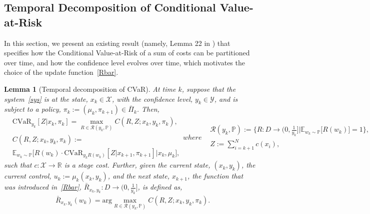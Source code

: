 \documentclass[letterpaper, 10 pt, conference]{ieeeconf}  %
\newtheorem{lemma}{Lemma}
\begin{document}
\subsection{Temporal Decomposition of Conditional Value-at-Risk}
In this section, we present an existing result (namely, Lemma 22 in \cite{pflug2016time}) 
that specifies how the Conditional Value-at-Risk of a sum of costs can be partitioned over time, and
how the confidence level evolves over time, which motivates the choice of the update function~\eqref{Rbar}.
%
\begin{lemma}[Temporal decomposition of CVaR]\label{decomlemma}
At time $k$, suppose that the system~\eqref{sys} is at the state, $x_k \in \mathcal{X}$, with the confidence level, $y_k \in \mathcal{Y}$, 
and is subject to a policy, $\pi_k := (\mu_k, \pi_{k+1}) \in \bar{\Pi}_k$. Then,
%
\begin{subequations}\label{decomp}
\begin{equation}\begin{aligned}
& \text{CVaR}_{y_k} [ Z | x_k, \pi_k ] = {\underset{R \in \mathcal{R}(y_k, \mathbb{P})}\max} C(R, Z; x_k, y_k, \pi_k), \\
& C(R, Z; x_k, y_k, \pi_k) :=\\
& \mathbb{E}_{w_k \sim \mathbb{P}}\big[ R(w_k) \cdot \text{CVaR}_{y_k R(w_k)}[ Z | x_{k+1}, \pi_{k+1} ] \big| x_k, \mu_k \big],
\end{aligned}
\end{equation}
%
where 
%
\begin{equation}\begin{aligned}
& \mathcal{R}(y_k, \mathbb{P})
:= \big\{ R : D \to \big(0,\textstyle\frac{1}{y_k}\big] \mathrel{\big|} \mathbb{E}_{w_k \sim \mathbb{P}}\big[ R(w_k) \big] = 1 \big\}, \\
& Z := \textstyle \sum_{i=k+1}^N c(x_i),
\end{aligned}\end{equation}
\end{subequations}
such that $c: \mathcal{X} \to \mathbb{R}$ is a stage cost.
%
Further, given the current state, $(x_k, y_k)$, the current control, $u_k := \mu_k(x_k, y_k)$, and the next state, $x_{k+1}$, 
the function that was introduced in~\eqref{Rbar}, $\bar{R}_{x_k,y_k} : D \to (0,\frac{1}{y_k}]$, is defined as,
\begin{equation}\begin{aligned}
& \bar{R}_{x_k,y_k}(w_k) = \text{arg}{\underset{R \in \mathcal{R}(y_k,\mathbb{P})}\max} C(R, Z; x_k, y_k, \pi_k).
\end{aligned}
\end{equation}
\end{lemma}
\end{document}
